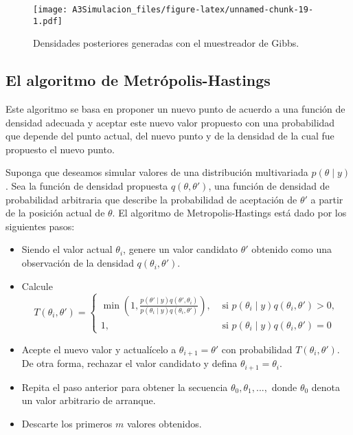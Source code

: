 \documentclass[
  spanish,
]{book}
\providecommand{\tightlist}{%
  \setlength{\itemsep}{0pt}\setlength{\parskip}{0pt}}
\theoremstyle{definition}
\theoremstyle{definition}
\theoremstyle{definition}
\theoremstyle{definition}
\theoremstyle{remark}
\begin{document}
\begin{figure}
\centering
\texttt{[image: A3Simulacion\_files/figure-latex/unnamed-chunk-19-1.pdf]}
\caption{\label{fig:unnamed-chunk-19}Densidades posteriores generadas con el muestreador de Gibbs.}
\end{figure}

\hypertarget{el-algoritmo-de-metruxf3polis-hastings}{%
\subsection{El algoritmo de Metrópolis-Hastings}\label{el-algoritmo-de-metruxf3polis-hastings}}

Este algoritmo se basa en proponer un nuevo punto de acuerdo a una función de densidad adecuada y aceptar este nuevo valor propuesto con una probabilidad que depende del punto actual, del nuevo punto y de la densidad de la cual fue propuesto el nuevo punto.

Suponga que deseamos simular valores de una distribución multivariada \(p(\theta \mid y)\). Sea la función de densidad propuesta \(q(\theta, \theta')\), una función de densidad de probabilidad arbitraria que
describe la probabilidad de aceptación de \(\theta'\) a partir de la posición actual de \(\theta\). El algoritmo de Metropolis-Hastings está dado por los siguientes pasos:

\begin{itemize}
\tightlist
\item
  Siendo el valor actual \(\theta_i\), genere un valor candidato \(\theta'\) obtenido como una observación de la densidad \(q(\theta_i, \theta')\).
\item
  Calcule
  \begin{equation*}
  T(\theta_i, \theta') =
  \begin{cases}
  \min \left(1,  \frac{p(\theta' \mid  y)q(\theta', \theta_i)}{p(\theta_i \mid  y)q(\theta_i, \theta')} \right),
  & \text{  si   } p(\theta_i \mid  y)q(\theta_i, \theta') > 0,\\ 
  1, & \text{  si   }
  p(\theta_i \mid y)q(\theta_i, \theta') = 0
  \end{cases}
  \end{equation*}
\item
  Acepte el nuevo valor y actualícelo a \(\theta_{i+1}=\theta'\) con probabilidad \(T(\theta_i, \theta')\). De otra forma, rechazar el valor candidato y defina \(\theta_{i+1}=\theta_i\).

  \item

  Repita el paso anterior para obtener la secuencia \(\theta_0,\theta_1,...,\)
  donde \(\theta_0\) denota un valor arbitrario de arranque.

  \item

  Descarte los primeros \(m\) valores obtenidos.
\end{itemize}
\end{document}
